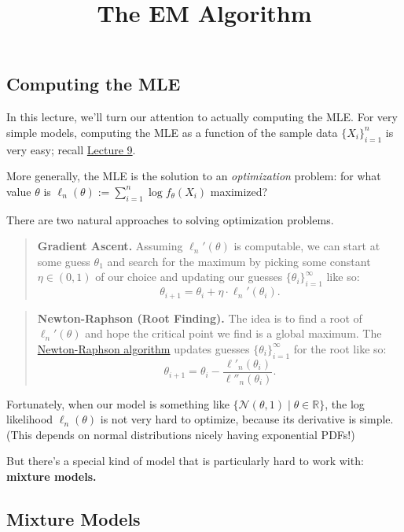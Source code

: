 \title{The EM Algorithm}



\subsection{Computing the MLE}

In this lecture, we'll turn our attention to actually computing the MLE.
For very simple models, computing the MLE as a function of the sample data
$\{X_i\}_{i = 1}^n$ is very easy; recall
\href{/18.650/lectures/9/#defining-the-maximum-likelihood-estimator-mle}{Lecture 9}.

More generally, the MLE is the solution to an \emph{optimization} problem:
for what value $\theta$ is $\ell_n(\theta) := \sum_{i = 1}^n \log f_{\theta}(X_i)$ maximized?

There are two natural approaches to solving optimization problems.

\begin{quote}
    \textbf{Gradient Ascent.} Assuming $\ell_n'(\theta)$
    is computable, we can start at some guess $\theta_1$ and search for the maximum
    by picking some constant $\eta \in (0, 1)$ of our choice
    and updating our guesses $\{\theta_i\}_{i = 1}^{\infty}$ like so:
    \[ \theta_{i + 1} = \theta_i +
    \eta \cdot \ell_n'(\theta_i). \]
\end{quote}

\begin{quote}
    \textbf{Newton-Raphson (Root Finding).} The idea is to find a root of $\ell_n'(\theta)$
    and hope the critical point we find is a global maximum.
    The \href{https://en.wikipedia.org/wiki/Newton's_method}{Newton-Raphson algorithm}
    updates guesses $\{\theta_i\}_{i = 1}^{\infty}$ for the root like so:
    \[ \theta_{i + 1} = \theta_i - \frac{\ell'_n(\theta_i)}{\ell''_n(\theta_i)}. \]
\end{quote}

Fortunately, when our model is something like $\{\mathcal{N}(\theta, 1) \mid \theta \in \mathbb{R}\}$,
the log likelihood $\ell_n(\theta)$ is not very hard to optimize,
because its derivative is simple.
(This depends on normal distributions nicely having exponential PDFs!)

But there's a special kind of model
that is particularly hard to work with: \textbf{mixture models.}

\subsection{Mixture Models}

